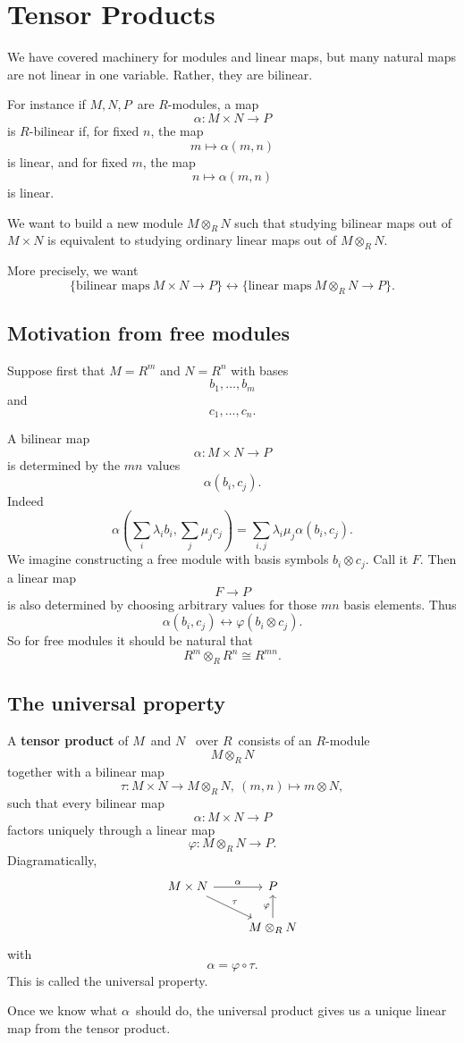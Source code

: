 \documentclass[11pt]{article}
\begin{document}
\section{Tensor Products}
We have covered machinery for modules and linear 
maps, but many natural maps are not linear in 
one variable. Rather, they are bilinear. 

For instance if $M,N,P$ are $R$-modules, a map 
\[
    \alpha : M \times N \to P
\]
is $R$-bilinear if, for fixed $n$, the map 
\[
    m \mapsto \alpha(m,n)
\]
is linear, and for fixed $m$, the 
map 
\[
    n \mapsto \alpha(m,n)
\]
is linear.  

We want to build a new module 
$M \otimes_R N$ such that studying 
bilinear maps out of $M \times N$ is 
equivalent to studying ordinary linear maps 
out of $M \otimes_R N$. 

More precisely, we want 
\[
    \{\text{bilinear maps} \ M \times N \to P\} 
    \leftrightarrow 
    \{\text{linear maps} \ M \otimes_R N \to P\}.
\]

\subsection{Motivation from free modules}
Suppose first that $M = R^m$ and $N = R^n$ 
with bases 
\[
    b_1,\ldots,b_m
\]
and 
\[
    c_1,\ldots,c_n.
\]

A bilinear map 
\[
    \alpha : M \times N \to P
\]
is determined by the $mn$ values 
\[
    \alpha(b_i,c_j). 
\]
Indeed 
\[
    \alpha\left(\sum_i \lambda_i b_i, \sum_j \mu_j c_j\right) 
    = \sum_{i,j}\lambda_i \mu_j \alpha (b_i,c_j).
\]
We imagine constructing a free module with basis 
symbols $b_i \otimes c_j$.
Call it $F$. Then a linear map 
\[
    F \to P
\]
is also determined by choosing arbitrary values for those 
$mn$ basis elements. 
Thus 
\[
    \alpha(b_i,c_j) \leftrightarrow 
    \varphi(b_i \otimes c_j). 
\]
So for free modules it should be natural that 
\[
    R^m \otimes_R R^n \cong R^{mn}. 
\]

\subsection{The universal property}
\begin{defn}
    A \textbf{tensor product} of $M$ and $N$ 
    over $R$ consists of an $R$-module 
    \[
        M \otimes_R N
    \]
    together with a bilinear map 
    \[
        \tau : M \times N \to M \otimes_R N, 
        \ (m,n) \mapsto m \otimes N, 
    \]
    such that every bilinear map 
    \[
        \alpha : M \times N \to P
    \]
    factors uniquely through a linear map 
    \[
        \varphi : M \otimes_R N \to P. 
    \]
    Diagramatically, 
    \[
    \begin{tikzcd}
    M\times N \arrow[r, "\alpha"] 
    \arrow[dr, "\tau"] & P \\
        & M \otimes_R N \arrow[u, "\varphi"]
    \end{tikzcd}
    \]
    with 
    \[
        \alpha = \varphi \circ \tau. 
    \]
    This is called the universal property. 
\end{defn}
Once we know what $\alpha$ should do, the universal 
product gives us a unique linear map from the 
tensor product. 
\end{document}

